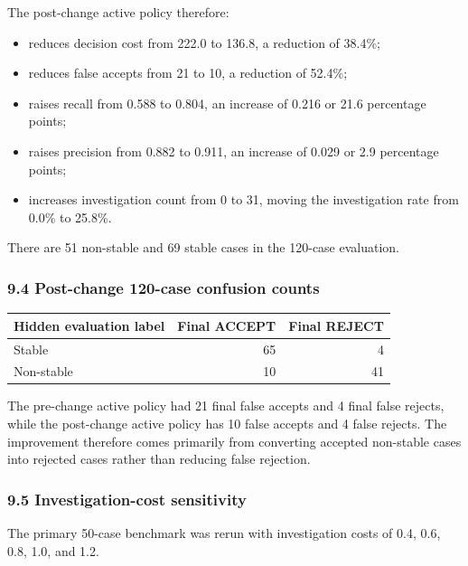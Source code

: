 \documentclass[
]{article}
\providecommand{\tightlist}{%
  \setlength{\itemsep}{0pt}\setlength{\parskip}{0pt}}
\begin{document}
The post-change active policy therefore:

\begin{itemize}
\tightlist
\item
  reduces decision cost from 222.0 to 136.8, a reduction of 38.4\%;
\item
  reduces false accepts from 21 to 10, a reduction of 52.4\%;
\item
  raises recall from 0.588 to 0.804, an increase of 0.216 or 21.6
  percentage points;
\item
  raises precision from 0.882 to 0.911, an increase of 0.029 or 2.9
  percentage points;
\item
  increases investigation count from 0 to 31, moving the investigation
  rate from 0.0\% to 25.8\%.
\end{itemize}

There are 51 non-stable and 69 stable cases in the 120-case evaluation.

\subsubsection{9.4 Post-change 120-case confusion
counts}\label{post-change-120-case-confusion-counts}

\begin{longtable}[]{@{}lrr@{}}
\toprule\noalign{}
Hidden evaluation label & Final ACCEPT & Final REJECT \\
\midrule\noalign{}
\endhead
\bottomrule\noalign{}
\endlastfoot
Stable & 65 & 4 \\
Non-stable & 10 & 41 \\
\end{longtable}

The pre-change active policy had 21 final false accepts and 4 final
false rejects, while the post-change active policy has 10 false accepts
and 4 false rejects. The improvement therefore comes primarily from
converting accepted non-stable cases into rejected cases rather than
reducing false rejection.

\subsubsection{9.5 Investigation-cost
sensitivity}\label{investigation-cost-sensitivity}

The primary 50-case benchmark was rerun with investigation costs of 0.4,
0.6, 0.8, 1.0, and 1.2.
\end{document}
